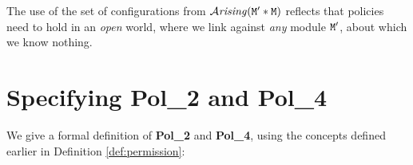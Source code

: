 \documentclass[acmsmall,screen]{acmart}
\begin{document}
The use of the set of configurations from ${\mathcal{A}}\textrm{\textit{rising}}({\mbox{\tt{M}}}'*{\mbox{\tt{M}}})$ reflects that policies
 need to hold in an {\em open} world, where
we link against {\em any} module ${\mbox{\tt{M}}}'$, 
about which we know nothing. 
% 
 
 \section{Specifying  {\bf {Pol\_2}} and  {\bf {Pol\_4}}}

We    give a formal definition of {\bf {Pol\_2}} and  {\bf {Pol\_4}}, using the concepts defined earlier in  Definition \ref{def:permission}: %
\end{document}

